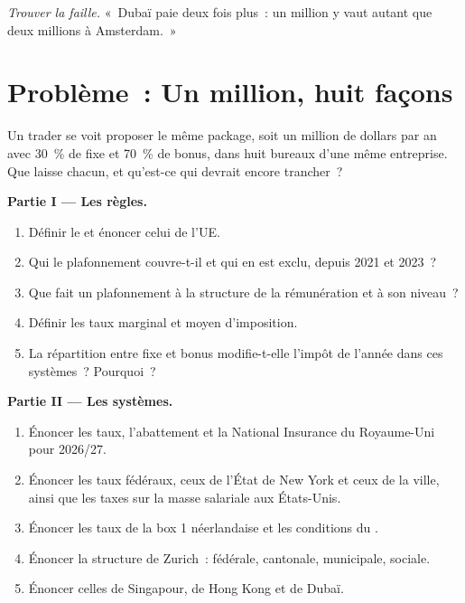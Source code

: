 \begin{exercise}[$\star\star\star$]\label{exo:in:pay-regulation-and-tax-by-location:8}
\emph{Trouver la faille.} «~Dubaï paie deux fois plus~: un million y vaut autant que deux millions à Amsterdam.~»
\end{exercise}

\section{Problème~: Un million, huit façons}

\begin{problem}\label{pb:in:pay-regulation-and-tax-by-location:1}
Un trader se voit proposer le même package, soit un million de dollars par an avec 30~\% de fixe et 70~\% de bonus, dans huit bureaux
d'une même entreprise. Que laisse chacun, et qu'est-ce qui devrait encore trancher~?

\medskip\noindent\textbf{Partie I --- Les règles.}
\begin{enumerate}
\item Définir le  et énoncer celui de l'UE.
\item Qui le plafonnement couvre-t-il et qui en est exclu, depuis 2021 et 2023~?
\item Que fait un plafonnement à la structure de la rémunération et à son niveau~?
\item Définir les taux marginal et moyen d'imposition.
\item La répartition entre fixe et bonus modifie-t-elle l'impôt de l'année dans ces systèmes~? Pourquoi~?
\end{enumerate}

\medskip\noindent\textbf{Partie II --- Les systèmes.}
\begin{enumerate}[resume]
\item Énoncer les taux, l'abattement et la National Insurance du Royaume-Uni pour 2026/27.
\item Énoncer les taux fédéraux, ceux de l'État de New York et ceux de la ville, ainsi que les taxes sur la masse salariale aux États-Unis.
\item Énoncer les taux de la box 1 néerlandaise et les conditions du .
\item Énoncer la structure de Zurich~: fédérale, cantonale, municipale, sociale.
\item Énoncer celles de Singapour, de Hong Kong et de Dubaï.
\end{enumerate}


\end{problem}
